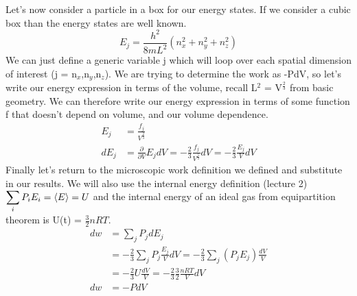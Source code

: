 \documentclass{article}
\begin{document}
Let's now consider a particle in a box for our energy states. 
If we consider a cubic box than the energy states are well known.
\begin{equation}
E_j = \frac{h^2}{8mL^2}(n_x^2+n_y^2+n_z^2)
\end{equation}
We can just define a generic variable j which will loop over each spatial dimension of interest (j = n$_x$,n$_y$,n$_z$).
We are trying to determine the work as -PdV, so let's write our energy expression in terms of the volume, recall L$^2$ = V$^{\frac{2}{3}}$ from basic geometry. 
We can therefore write our energy expression in terms of some function f that doesn't depend on volume, and our volume dependence. 
\begin{equation}
\begin{split}
E_j &= \frac{f_j}{V^{\frac{2}{3}}} \\
dE_j &= \frac{\partial }{\partial V}E_j dV = -\frac{2}{3}\frac{f_j}{V^{\frac{5}{3}}}dV = -\frac{2}{3}\frac{E_j}{V}dV
\end{split}
\end{equation}
Finally let's return to the microscopic work definition we defined and substitute in our results. 
We will also use the internal energy definition (lecture 2) $\displaystyle\sum_iP_iE_i = \braket{E} = U$ and the internal energy of an ideal gas from equipartition theorem is U(t) = $\frac{3}{2}nRT$. 
\begin{equation}
\begin{split}
    dw &= \sum_j P_jdE_j \\
    &= -\frac{2}{3} \sum_j P_j\frac{E_j}{V}dV = -\frac{2}{3} \sum_j (P_jE_j) \frac{dV}{V}  \\
    &= -\frac{2}{3} U\frac{dV}{V} = -\frac{2}{3}\frac{3}{2}\frac{nRT}{V}dV \\
    dw &= -PdV
\end{split}
\end{equation}
\end{document}
